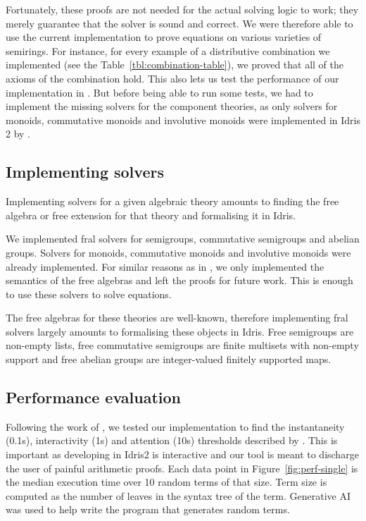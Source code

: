 Fortunately, these proofs are not needed for the actual solving logic to work; they merely guarantee that the solver is sound and correct. We were therefore able to use the current implementation to prove equations on various varieties of semirings. For instance, for every example of a distributive combination we implemented (see the Table~\ref{tbl:combination-table}), we proved that all of the axioms of the combination hold. This also lets us test the performance of our implementation in . But before being able to run some tests, we had to implement the missing solvers for the component theories, as only solvers for monoids, commutative monoids and involutive monoids were implemented in Idris 2 by \citeauthor{idris_frex}.

\subsection{Implementing solvers}
\label{sec:solver_implem}

Implementing solvers for a given algebraic theory amounts to finding the free algebra or free extension for that theory and formalising it in Idris.

We implemented fral solvers for semigroups, commutative semigroups and abelian groups. Solvers for monoids, commutative monoids and involutive monoids were already implemented. For similar reasons as in , we only implemented the semantics of the free algebras and left the proofs for future work. This is enough to use these solvers to solve equations.

The free algebras for these theories are well-known, therefore implementing fral solvers largely amounts to formalising these objects in Idris. Free semigroups are non-empty lists, free commutative semigroups are finite multisets with non-empty support and free abelian groups are integer-valued finitely supported maps.

\subsection{Performance evaluation}
\label{sec:perf-eval}

Following the work of \cite{idris_frex}, we tested our implementation to find the instantaneity (0.1s), interactivity (1s) and attention (10s) thresholds described by \cite{nielsen:usability-engineering}. This is important as developing in Idris2 is interactive and our tool is meant to discharge the user of painful arithmetic proofs. Each data point in Figure~\ref{fig:perf-single} is the median execution time over 10 random terms of that size. Term size is computed as the number of leaves in the syntax tree of the term. Generative AI was used to help write the program that generates random terms.


